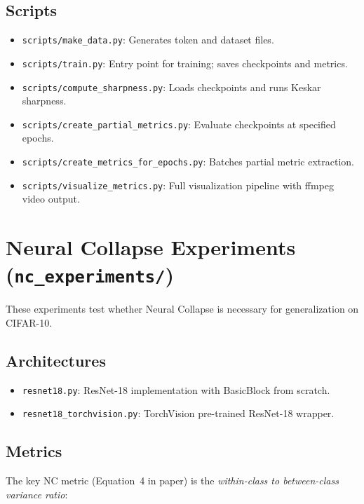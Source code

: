 \documentclass[11pt,a4paper]{article}
\theoremstyle{definition}
\begin{document}
\subsection{Scripts}

\begin{itemize}[leftmargin=*]
    \item \texttt{scripts/make\_data.py}: Generates token and dataset files.
    \item \texttt{scripts/train.py}: Entry point for training; saves checkpoints and metrics.
    \item \texttt{scripts/compute\_sharpness.py}: Loads checkpoints and runs Keskar sharpness.
    \item \texttt{scripts/create\_partial\_metrics.py}: Evaluate checkpoints at specified epochs.
    \item \texttt{scripts/create\_metrics\_for\_epochs.py}: Batches partial metric extraction.
    \item \texttt{scripts/visualize\_metrics.py}: Full visualization pipeline with ffmpeg video output.
\end{itemize}

\section{Neural Collapse Experiments (\texttt{nc\_experiments/})}

These experiments test whether Neural Collapse is necessary for generalization on CIFAR-10.

\subsection{Architectures}
\begin{itemize}[leftmargin=*]
    \item \texttt{resnet18.py}: ResNet-18 implementation with BasicBlock from scratch.
    \item \texttt{resnet18\_torchvision.py}: TorchVision pre-trained ResNet-18 wrapper.
\end{itemize}

\subsection{Metrics}
The key NC metric (Equation~4 in paper) is the \emph{within-class to between-class variance ratio}:
\end{document}
